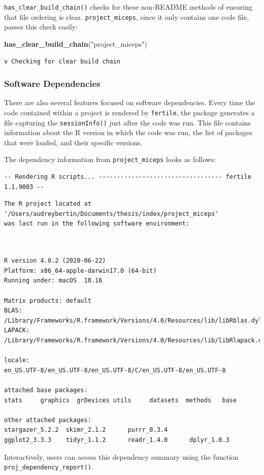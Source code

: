 \documentclass[12pt,twoside]{reedthesis}
\newenvironment{Shaded}{\begin{snugshade}}{\end{snugshade}}
\newcommand{\KeywordTok}[1]{\textcolor[rgb]{0.13,0.29,0.53}{\textbf{#1}}}
\newcommand{\NormalTok}[1]{#1}
\newcommand{\StringTok}[1]{\textcolor[rgb]{0.31,0.60,0.02}{#1}}
\begin{document}
\texttt{has\_clear\_build\_chain()} checks for these non-README methods of ensuring that file ordering is clear. \texttt{project\_miceps}, since it only contains one code file, passes this check easily:
\begin{Shaded}
\begin{Highlighting}[]
\KeywordTok{has_clear_build_chain}\NormalTok{(}\StringTok{"project_miceps"}\NormalTok{)}
\end{Highlighting}
\end{Shaded}
\begin{verbatim}
v Checking for clear build chain
\end{verbatim}
\hypertarget{software-dependencies}{%
\subsubsection{Software Dependencies}\label{software-dependencies}}

There are also several features focused on software dependencies. Every time the code contained within a project is rendered by \texttt{fertile}, the package generates a file capturing the \texttt{sessionInfo()} just after the code was run. This file contains information about the R version in which the code was run, the list of packages that were loaded, and their specific versions.

The dependency information from \texttt{project\_miceps} looks as follows:
\begin{verbatim}
-- Rendering R scripts... ---------------------------------- fertile 1.1.9003 --
\end{verbatim}
\begin{verbatim}
The R project located at '/Users/audreybertin/Documents/thesis/index/project_miceps' 
was last run in the following software environment:
\end{verbatim}
\begin{verbatim}


R version 4.0.2 (2020-06-22)
Platform: x86_64-apple-darwin17.0 (64-bit)
Running under: macOS  10.16

Matrix products: default
BLAS:   /Library/Frameworks/R.framework/Versions/4.0/Resources/lib/libRblas.dylib
LAPACK: /Library/Frameworks/R.framework/Versions/4.0/Resources/lib/libRlapack.dylib

locale:
en_US.UTF-8/en_US.UTF-8/en_US.UTF-8/C/en_US.UTF-8/en_US.UTF-8

attached base packages:
stats     graphics  grDevices utils     datasets  methods   base     

other attached packages:
stargazer_5.2.2  skimr_2.1.2      purrr_0.3.4     
ggplot2_3.3.3    tidyr_1.1.2      readr_1.4.0      dplyr_1.0.3     
\end{verbatim}
Interactively, users can access this dependency summary using the function \texttt{proj\_dependency\_report()}.
\end{document}
